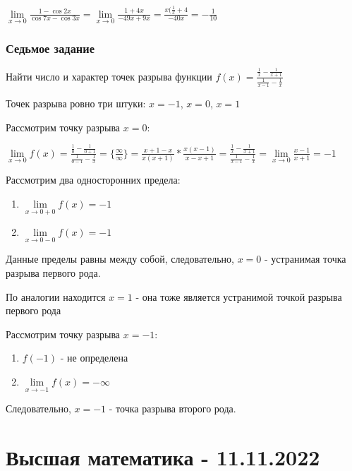 \documentclass{article}
\begin{document}
\begin{flushleft}
$
\lim\limits_{x \to 0} \frac{1 - \cos 2x}{\cos 7x - \cos 3x}
=
\lim\limits_{x \to 0} \frac{1 + 4x}{-49x + 9x}
=
\frac{x(\frac{1}{x} + 4}{-40x}
=
-\frac{1}{10}
$

\subsubsection{Седьмое задание}

Найти число и характер точек разрыва функции $f(x) = \frac{\frac{1}{x} - \frac{1}{x + 1}}{\frac{1}{x - 1} - \frac{1}{x}}$

Точек разрыва ровно три штуки: $x = -1$, $x = 0$, $x = 1$

\hfill

Рассмотрим точку разрыва $x = 0$:

$
\lim\limits_{x \to 0} f(x) = \frac{\frac{1}{0} - \frac{1}{0 + 1}}{\frac{1}{0 - 1} - \frac{1}{x}} = \{ \frac{\infty}{\infty} \} = \frac{x + 1 - x}{x(x+1)} * \frac{x(x - 1)}{x - x + 1} = \frac{\frac{1}{x} - \frac{1}{x + 1}}{\frac{1}{x - 1} - \frac{1}{x}} = \lim\limits_{x \to 0} \frac{x - 1}{x + 1} = -1
$

Рассмотрим два односторонних предела:

\begin{enumerate}
    \item $\lim\limits_{x \to 0 + 0} f(x) = -1$
    \item $\lim\limits_{x \to 0 - 0} f(x) = -1$
\end{enumerate}

Данные пределы равны между собой, следовательно, $x = 0$ - устранимая точка разрыва первого рода.

\hfill

По аналогии находится $x = 1$ - она тоже является устранимой точкой разрыва первого рода

\hfill

Рассмотрим точку разрыва $x = -1$:

\begin{enumerate}
    \item $f(-1)$ - не определена
    \item $\lim\limits_{x \to -1} f(x) = -\infty$
\end{enumerate}

Следовательно, $x = -1$ - точка разрыва второго рода.

\end{flushleft}

\pagebreak
\section{Высшая математика - 11.11.2022}
\end{document}
